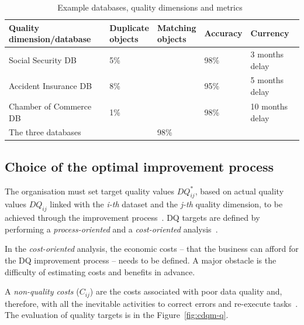 \begin{table}[htbp]
    \centering

    \begin{tabular}{@{}lllll@{}}
        \toprule
        Quality dimension/database  & \shortstack{Duplicate \\ objects} & \shortstack{Matching \\ objects}  & Accuracy  & Currency          \\ \midrule
        Social Security DB          & 5\%                               &                                   & 98\%      & 3 months delay    \\
        Accident Insurance DB       & 8\%                               &                                   & 95\%      & 5 months delay    \\
        Chamber of Commerce DB      & 1\%                               &                                   & 98\%      & 10 months delay   \\
        The three databases         &                                   & 98\%                              &           &                   \\
        \bottomrule
    \end{tabular}

    \caption{Example databases, quality dimensions and metrics~\cite{batini2008}}
    \label{table:ex-dat}
\end{table}
\FloatBarrier

\subsection{Choice of the optimal improvement process}

The organisation must set target quality values \( DQ_{ij}^* \), based on actual quality values \( DQ_{ij} \) linked with the \textit{i-th} dataset and the \textit{j-th} quality dimension, to be achieved through the improvement process~\cite{batini2008}.
DQ targets are defined by performing a \textit{process-oriented} and a \textit{cost-oriented} analysis~\cite{batini2008}.

In the \textit{cost-oriented} analysis, the economic costs – that the business can afford for the DQ improvement process – needs to be defined.
A major obstacle is the difficulty of estimating costs and benefits in advance.

A \textit{non-quality costs} (\( C_{ij} \)) are the costs associated with poor data quality and, therefore, with all the inevitable activities to correct errors and re-execute tasks~\cite{batini2008}.
The evaluation of quality targets is in the Figure~\ref{fig:cdqm-q}.

